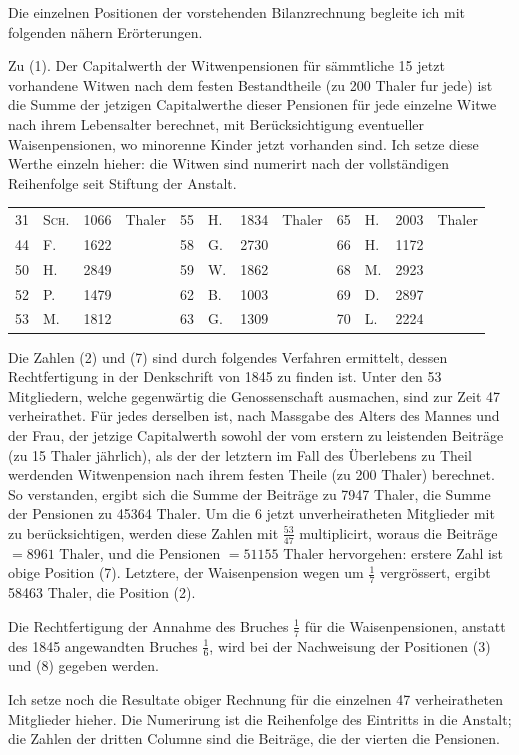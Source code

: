 \noindent\hspace*{\parindent}Die einzelnen Positionen der vorstehenden Bilanzrechnung begleite ich mit folgenden nähern Erörterungen.

Zu (1). Der Capitalwerth der Witwenpensionen für sämmtliche 15 jetzt vorhandene Witwen nach dem festen Bestandtheile (zu 200 Thaler fur jede) ist die Summe der jetzigen Capitalwerthe dieser Pensionen für jede einzelne Witwe nach ihrem Lebensalter berechnet, mit Berücksichtigung eventueller Waisenpensionen, wo minorenne Kinder jetzt vorhanden sind. Ich setze diese Werthe einzeln hieher: die Witwen sind numerirt nach der vollständigen Reihenfolge seit Stiftung der Anstalt.
\begin{center}
\footnotesize\setlength{\tabcolsep}{3pt}
\begin{tabular}{r|l|r l||r|l|r l||r|l|r l}
31&\textsc{Sch.}&1066&Thaler&55&H.&1834&Thaler&65&H.&2003&Thaler\\
44&F.&1622&&58&G.&2730&&66&H.&1172&\\
50&H.&2849&&59&W.&1862&&68&M.&2923&\\
52&P.&1479&&62&B.&1003&&69&D.&2897&\\
53&M.&1812&&63&G.&1309&&70&L.&2224&
\end{tabular}
\end{center}
\noindent\hspace*{\parindent}Die Zahlen (2) und (7) sind durch folgendes Verfahren ermittelt, dessen Rechtfertigung in der Denkschrift von 1845 zu finden ist. Unter den 53 Mitgliedern, welche gegenwärtig die Genossenschaft ausmachen, sind zur Zeit 47 verheirathet. Für jedes derselben ist, nach Massgabe des Alters des Mannes und der Frau, der jetzige Capitalwerth sowohl der vom erstern zu leistenden Beiträge (zu 15 Thaler jährlich), als der der letztern im Fall des Überlebens zu Theil werdenden Witwenpension nach ihrem festen Theile (zu 200 Thaler) berechnet. So verstanden, ergibt sich die Summe der Beiträge zu 7947 Thaler, die Summe der Pensionen zu 45364 Thaler. Um die 6 jetzt unverheiratheten Mitglieder mit zu berücksichtigen, werden diese Zahlen mit \(\tfrac{53}{47}\) multiplicirt, woraus die Beiträge \(=8961\) Thaler, und die Pensionen \(=51155\) Thaler hervorgehen: erstere Zahl ist obige Position (7). Letztere, der Waisenpension wegen um \(\tfrac{1}{7}\) vergrössert, ergibt 58463 Thaler, die Position (2).

Die Rechtfertigung der Annahme des Bruches \(\tfrac{1}{7}\) für die Waisenpensionen, anstatt des 1845 angewandten Bruches \(\tfrac{1}{6}\), wird bei der Nachweisung der Positionen (3) und (8) gegeben werden.

Ich setze noch die Resultate obiger Rechnung für die einzelnen 47 verheiratheten Mitglieder hieher. Die Numerirung ist die Reihenfolge des Eintritts in die Anstalt; die Zahlen der dritten Columne sind die Beiträge, die der vierten die Pensionen.
